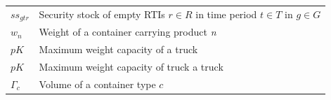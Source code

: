 \begin{longtable}[hbt!]{  |p{}|p{}  |}
  $ss_{gtr}$                                                                                     & Security stock of empty RTIs $r\in R$  in time period $t \in T$ in $g \in G$                                                                                                                                                                                                                                                                                                                                                                                                                                                                                                   \\
  \textit{$w_{n}$}                                                                               & Weight of a container carrying product \textit{n}
  \\
  \textit{$pK$}                                                                                  & Maximum  weight capacity of a truck                                                                                                                                                                                                                                                                                                                                                                                                                                                                                                                                            \\
  \textit{$pK$}                                                                                  & Maximum  weight capacity of truck a truck                                                                                                                                                                                                                                                                                                                                                                                                                                                                                                                                      \\
  \textit{$\Gamma_c$}                                                                            & Volume of a container type $c$                                                                                                                                                                                                                                                                                                                                                                                                                                                                                                                                                 \\

\end{longtable}
